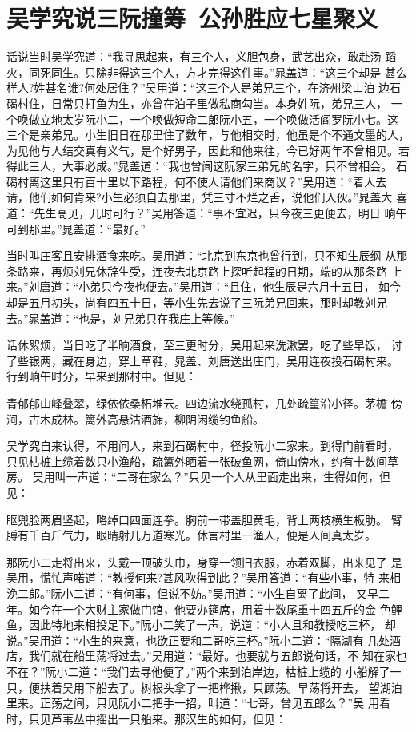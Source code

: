 \chapter{吴学究说三阮撞筹~公孙胜应七星聚义}

话说当时吴学究道：“我寻思起来，有三个人，义胆包身，武艺出众，敢赴汤
蹈火，同死同生。只除非得这三个人，方才完得这件事。”晁盖道：“这三个却是
甚么样人?姓甚名谁?何处居住？”吴用道：“这三个人是弟兄三个，在济州梁山泊
边石碣村住，日常只打鱼为生，亦曾在泊子里做私商勾当。本身姓阮，弟兄三人，
一个唤做立地太岁阮小二，一个唤做短命二郎阮小五，一个唤做活阎罗阮小七。这
三个是亲弟兄。小生旧日在那里住了数年，与他相交时，他虽是个不通文墨的人，
为见他与人结交真有义气，是个好男子，因此和他来往，今已好两年不曾相见。若
得此三人，大事必成。”晁盖道：“我也曾闻这阮家三弟兄的名字，只不曾相会。
石碣村离这里只有百十里以下路程，何不使人请他们来商议？”吴用道：“着人去
请，他们如何肯来?小生必须自去那里，凭三寸不烂之舌，说他们入伙。”晁盖大
喜道：“先生高见，几时可行？”吴用答道：“事不宜迟，只今夜三更便去，明日
晌午可到那里。”晁盖道：“最好。”

当时叫庄客且安排酒食来吃。吴用道：“北京到东京也曾行到，只不知生辰纲
从那条路来，再烦刘兄休辞生受，连夜去北京路上探听起程的日期，端的从那条路
上来。”刘唐道：“小弟只今夜也便去。”吴用道：“且住，他生辰是六月十五日，
如今却是五月初头，尚有四五十日，等小生先去说了三阮弟兄回来，那时却教刘兄
去。”晁盖道：“也是，刘兄弟只在我庄上等候。”

话休絮烦，当日吃了半晌酒食，至三更时分，吴用起来洗漱罢，吃了些早饭，
讨了些银两，藏在身边，穿上草鞋，晁盖、刘唐送出庄门，吴用连夜投石碣村来。
行到晌午时分，早来到那村中。但见：

青郁郁山峰叠翠，绿依依桑柘堆云。四边流水绕孤村，几处疏篁沿小径。茅檐
傍涧，古木成林。篱外高悬沽酒旆，柳阴闲缆钓鱼船。

吴学究自来认得，不用问人，来到石碣村中，径投阮小二家来。到得门前看时，
只见枯桩上缆着数只小渔船，疏篱外晒着一张破鱼网，倚山傍水，约有十数间草房。
吴用叫一声道：“二哥在家么？”只见一个人从里面走出来，生得如何，但见：

眍兜脸两眉竖起，略绰口四面连拳。胸前一带盖胆黄毛，背上两枝横生板肋。
臂膊有千百斤气力，眼晴射几万道寒光。休言村里一渔人，便是人间真太岁。

那阮小二走将出来，头戴一顶破头巾，身穿一领旧衣服，赤着双脚，出来见了
是吴用，慌忙声喏道：“教授何来?甚风吹得到此？”吴用答道：“有些小事，特
来相浼二郎。”阮小二道：“有何事，但说不妨。”吴用道：“小生自离了此间，
又早二年。如今在一个大财主家做门馆，他要办筵席，用着十数尾重十四五斤的金
色鲤鱼，因此特地来相投足下。”阮小二笑了一声，说道：“小人且和教授吃三杯，
却说。”吴用道：“小生的来意，也欲正要和二哥吃三杯。”阮小二道：“隔湖有
几处酒店，我们就在船里荡将过去。”吴用道：“最好。也要就与五郎说句话，不
知在家也不在？”阮小二道：“我们去寻他便了。”两个来到泊岸边，枯桩上缆的
小船解了一只，便扶着吴用下船去了。树根头拿了一把桦揪，只顾荡。早荡将开去，
望湖泊里来。正荡之间，只见阮小二把手一招，叫道：“七哥，曾见五郎么？”吴
用看时，只见芦苇丛中摇出一只船来。那汉生的如何，但见：


